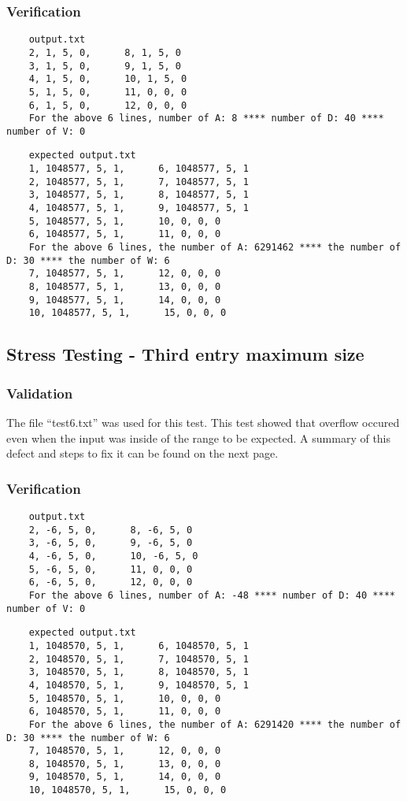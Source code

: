 \documentclass[]{article}
\begin{document}
	\subsubsection{Verification}
	\begin{lstlisting}
	output.txt
	2, 1, 5, 0,      8, 1, 5, 0
	3, 1, 5, 0,      9, 1, 5, 0
	4, 1, 5, 0,      10, 1, 5, 0
	5, 1, 5, 0,      11, 0, 0, 0
	6, 1, 5, 0,      12, 0, 0, 0
	For the above 6 lines, number of A: 8 **** number of D: 40 **** number of V: 0
	\end{lstlisting}
	\begin{lstlisting}
	expected output.txt
	1, 1048577, 5, 1,      6, 1048577, 5, 1
	2, 1048577, 5, 1,      7, 1048577, 5, 1
	3, 1048577, 5, 1,      8, 1048577, 5, 1
	4, 1048577, 5, 1,      9, 1048577, 5, 1
	5, 1048577, 5, 1,      10, 0, 0, 0
	6, 1048577, 5, 1,      11, 0, 0, 0
	For the above 6 lines, the number of A: 6291462 **** the number of D: 30 **** the number of W: 6
	7, 1048577, 5, 1,      12, 0, 0, 0
	8, 1048577, 5, 1,      13, 0, 0, 0
	9, 1048577, 5, 1,      14, 0, 0, 0
	10, 1048577, 5, 1,      15, 0, 0, 0
	\end{lstlisting}
	
	\newpage
	

\subsection{Stress Testing - Third entry maximum size}
	\subsubsection{Validation}
	The file ``test6.txt'' was used for this test.  This test showed that overflow
	occured even when the input was inside of the range to be expected.  A summary
	of this defect and steps to fix it can be found on the next page.
	
	\subsubsection{Verification}
	\begin{lstlisting}
	output.txt
	2, -6, 5, 0,      8, -6, 5, 0
	3, -6, 5, 0,      9, -6, 5, 0
	4, -6, 5, 0,      10, -6, 5, 0
	5, -6, 5, 0,      11, 0, 0, 0
	6, -6, 5, 0,      12, 0, 0, 0
	For the above 6 lines, number of A: -48 **** number of D: 40 **** number of V: 0

	\end{lstlisting}
	\begin{lstlisting}
	expected output.txt
	1, 1048570, 5, 1,      6, 1048570, 5, 1
	2, 1048570, 5, 1,      7, 1048570, 5, 1
	3, 1048570, 5, 1,      8, 1048570, 5, 1
	4, 1048570, 5, 1,      9, 1048570, 5, 1
	5, 1048570, 5, 1,      10, 0, 0, 0
	6, 1048570, 5, 1,      11, 0, 0, 0
	For the above 6 lines, the number of A: 6291420 **** the number of D: 30 **** the number of W: 6
	7, 1048570, 5, 1,      12, 0, 0, 0
	8, 1048570, 5, 1,      13, 0, 0, 0
	9, 1048570, 5, 1,      14, 0, 0, 0
	10, 1048570, 5, 1,      15, 0, 0, 0
	\end{lstlisting}
	
\end{document}
